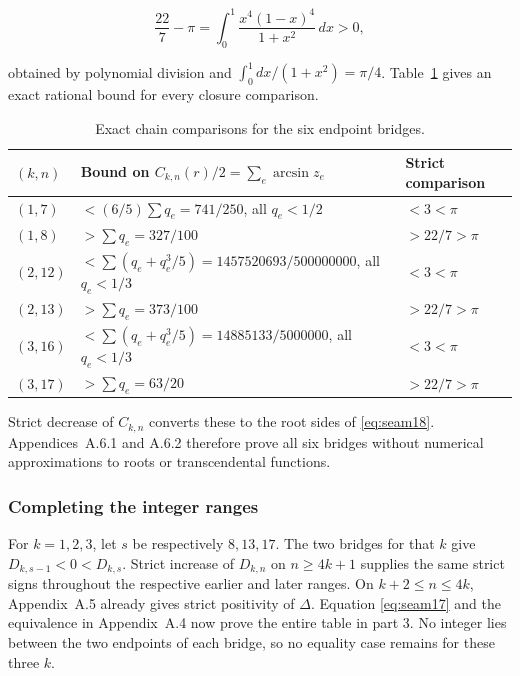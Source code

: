 \[
 \frac{22}7-\pi=\int_0^1\frac{x^4(1-x)^4}{1+x^2}\,dx>0,
\]

obtained by polynomial division and $\int_0^1dx/(1+x^2)=\pi/4$.
Table~\ref{tab:seam4} gives an exact rational bound for every closure comparison.

\begin{table}[htbp]\centering\small
\caption{Exact chain comparisons for the six endpoint bridges.}
\label{tab:seam4}
\setlength{\tabcolsep}{5pt}
\begin{tabularx}{\textwidth}{lXl}
\toprule
$(k,n)$ & Bound on $C_{k,n}(r)/2=\sum_e\arcsin z_e$ & Strict comparison \\
\midrule
$(1,7)$ & $<(6/5)\sum q_e=741/250$, all $q_e<1/2$ & $<3<\pi$ \\
$(1,8)$ & $>\sum q_e=327/100$ & $>22/7>\pi$ \\
$(2,12)$ & $<\sum(q_e+q_e^3/5)=1457520693/500000000$, all $q_e<1/3$ & $<3<\pi$ \\
$(2,13)$ & $>\sum q_e=373/100$ & $>22/7>\pi$ \\
$(3,16)$ & $<\sum(q_e+q_e^3/5)=14885133/5000000$, all $q_e<1/3$ & $<3<\pi$ \\
$(3,17)$ & $>\sum q_e=63/20$ & $>22/7>\pi$ \\
\bottomrule
\end{tabularx}
\end{table}

Strict decrease of $C_{k,n}$ converts these to the root sides of \eqref{eq:seam18}.
Appendices~A.6.1 and A.6.2 therefore prove all six bridges without numerical
approximations to roots or transcendental functions.

\subsubsection{Completing the integer ranges}

For $k=1,2,3$, let $s$ be respectively $8,13,17$. The
two bridges for that $k$ give $D_{k,s-1}<0<D_{k,s}$. Strict
increase of $D_{k,n}$ on $n\ge4k+1$ supplies the same strict
signs throughout the respective earlier and later ranges. On
$k+2\le n\le4k$, Appendix~A.5 already gives strict positivity of
$\Delta$. Equation \eqref{eq:seam17} and the equivalence in Appendix~A.4 now prove
the entire table in part 3. No integer lies between the two endpoints of
each bridge, so no equality case remains for these three $k$.
